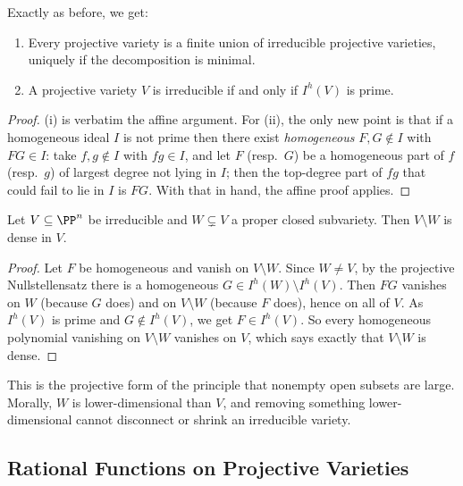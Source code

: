 Exactly as before, we get:

\begin{proposition}
	\begin{enumerate}[label=(\roman*)]
		\item Every projective variety is a finite union of irreducible projective varieties, uniquely if the decomposition is minimal.
		\item A projective variety $V$ is irreducible if and only if $I^h(V)$ is prime.
	\end{enumerate}
\end{proposition}

\begin{proof}
	(i) is verbatim the affine argument. For (ii), the only new point is that if a homogeneous ideal $I$ is not prime then there exist \emph{homogeneous} $F, G \notin I$ with $FG \in I$: take $f,g \notin I$ with $fg \in I$, and let $F$ (resp.\ $G$) be a homogeneous part of $f$ (resp.\ $g$) of largest degree not lying in $I$; then the top-degree part of $fg$ that could fail to lie in $I$ is $FG$. With that in hand, the affine proof applies.
\end{proof}

\begin{proposition}\label{prop:opendense}
	Let $V \subseteq \PP^n$ be irreducible and $W \subsetneq V$ a proper closed subvariety. Then $V \setminus W$ is dense in $V$.
\end{proposition}

\begin{proof}
	Let $F$ be homogeneous and vanish on $V \setminus W$. Since $W \neq V$, by the projective Nullstellensatz there is a homogeneous $G \in I^h(W) \setminus I^h(V)$. Then $FG$ vanishes on $W$ (because $G$ does) and on $V \setminus W$ (because $F$ does), hence on all of $V$. As $I^h(V)$ is prime and $G \notin I^h(V)$, we get $F \in I^h(V)$. So every homogeneous polynomial vanishing on $V\setminus W$ vanishes on $V$, which says exactly that $V \setminus W$ is dense.
\end{proof}

This is the projective form of the principle that nonempty open subsets are large. Morally, $W$ is lower-dimensional than $V$, and removing something lower-dimensional cannot disconnect or shrink an irreducible variety.

\subsection{Rational Functions on Projective Varieties}

